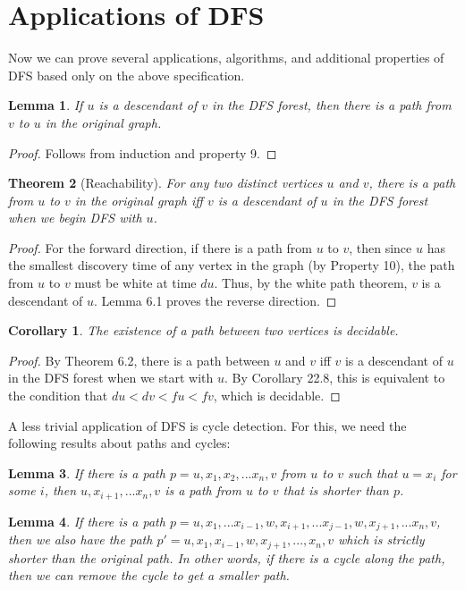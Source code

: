 \documentclass{article}
\newtheorem{theorem}{Theorem}[section]
\newtheorem{corollary}{Corollary}[theorem]
\newtheorem{lemma}[theorem]{Lemma}
\begin{document}
\section{Applications of DFS}
Now we can prove several applications, algorithms, and additional properties of DFS based only on the above specification.
\begin{lemma}
If $u$ is a descendant of $v$ in the DFS forest, then there is a path from $v$ to $u$ in the original graph.
\end{lemma}
\begin{proof}
Follows from induction and property 9.
\end{proof}
\begin{theorem}[Reachability]
For any two distinct vertices $u$ and $v$, there is a path from $u$ to $v$ in the original graph iff $v$ is a descendant of $u$ in the DFS forest when we begin DFS with $u$.
\end{theorem}
\begin{proof}
For the forward direction, if there is a path from $u$ to $v$, then since $u$ has the smallest discovery time of any vertex in the graph (by Property 10), the path from $u$ to $v$ must be white at time $du$. Thus, by the white path theorem, $v$ is a descendant of $u$. Lemma 6.1 proves the reverse direction.
\end{proof}
\begin{corollary}
The existence of a path between two vertices is decidable.
\end{corollary}
\begin{proof}
By Theorem 6.2, there is a path between $u$ and $v$ iff $v$ is a descendant of $u$ in the DFS forest when we start with $u$. By Corollary 22.8, this is equivalent to the condition that $du < dv < fu < fv$, which is decidable.
\end{proof}
A less trivial application of DFS is cycle detection. For this, we need the following results about paths and cycles:
\begin{lemma}
If there is a path $p=u,x_1,x_2,...x_n,v$ from $u$ to $v$ such that $u=x_i$ for some $i$, then $u,x_{i+1},...x_n,v$ is a path from $u$ to $v$ that is shorter than $p$. 
\end{lemma}
\begin{lemma}
If there is a path $p=u,x_1,...x_{i-1},w,x_{i+1},...x_{j-1},w,x_{j+1},...x_n,v$, then we also have the path $p'=u,x_1,x_{i-1},w,x_{j+1},...,x_n,v$ which is strictly shorter than the original path. In other words, if there is a cycle along the path, then we can remove the cycle to get a smaller path.
\end{lemma}
\end{document}
